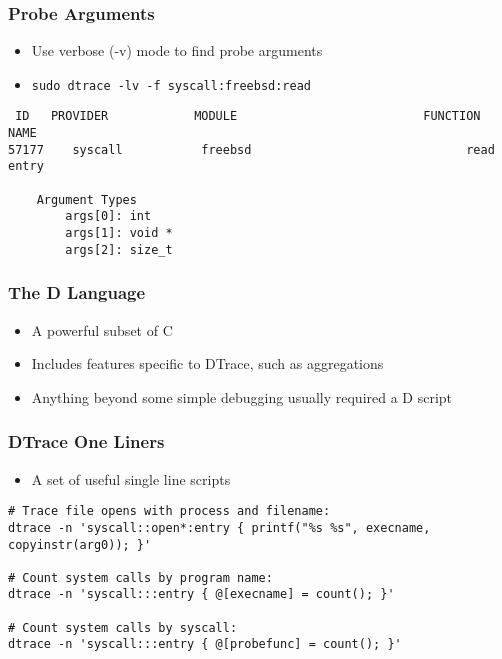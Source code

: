 \documentclass[pdftex]{beamer}
\begin{document}
\begin{frame}
  \frametitle{Probe Arguments}
  \begin{itemize}
  \item Use verbose (-v) mode to find probe arguments
  \item \Verb+sudo dtrace -lv -f syscall:freebsd:read+
  \end{itemize}
\begin{verbatim}
 ID   PROVIDER            MODULE                          FUNCTION NAME
57177    syscall           freebsd                              read entry

	Argument Types
		args[0]: int
		args[1]: void *
		args[2]: size_t
\end{verbatim}
\end{frame}

\begin{frame}
  \frametitle{The D Language}
  \begin{itemize}
  \item A powerful subset of C
  \item Includes features specific to DTrace, such as aggregations
  \item Anything beyond some simple debugging usually required a D
    script
  \end{itemize}
\end{frame}

\begin{frame}[fragile]
  \frametitle{DTrace One Liners}
  \begin{itemize}
  \item A set of useful single line scripts
  \end{itemize}
\begin{lstlisting}
# Trace file opens with process and filename:
dtrace -n 'syscall::open*:entry { printf("%s %s", execname, copyinstr(arg0)); }'

# Count system calls by program name:
dtrace -n 'syscall:::entry { @[execname] = count(); }'

# Count system calls by syscall:
dtrace -n 'syscall:::entry { @[probefunc] = count(); }'
\end{lstlisting}
\end{frame}
\end{document}
